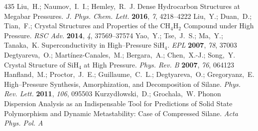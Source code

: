\documentclass[12pt,letterpaper,oneside]{article}
\begin{document}
\begin{mcitethebibliography}{435}
\mciteBstWouldAddEndPuncttrue
\mciteSetBstMidEndSepPunct{\mcitedefaultmidpunct}
{\mcitedefaultendpunct}{\mcitedefaultseppunct}\relax
\EndOfBibitem
{}
Liu,~H.; Naumov,~I.~I.; Hemley,~R.~J. Dense Hydrocarbon Structures at Megabar
  Pressures. \emph{J. Phys. Chem. Lett.} \textbf{2016}, \emph{7},
  4218--4222\relax
\mciteBstWouldAddEndPuncttrue
\mciteSetBstMidEndSepPunct{\mcitedefaultmidpunct}
{\mcitedefaultendpunct}{\mcitedefaultseppunct}\relax
\EndOfBibitem
{}
Liu,~Y.; Duan,~D.; Tian,~F.;   Crystal
  Structures and Properties of the CH$_4$H$_2$ Compound under High Pressure.
  \emph{RSC Adv.} \textbf{2014}, \emph{4}, 37569--37574\relax
\mciteBstWouldAddEndPuncttrue
\mciteSetBstMidEndSepPunct{\mcitedefaultmidpunct}
{\mcitedefaultendpunct}{\mcitedefaultseppunct}\relax
\EndOfBibitem
{}
Yao,~Y.; Tse,~J.~S.; Ma,~Y.; Tanaka,~K. Superconductivity in High--Pressure
  SiH$_4$. \emph{EPL} \textbf{2007}, \emph{78}, 37003\relax
\mciteBstWouldAddEndPuncttrue
\mciteSetBstMidEndSepPunct{\mcitedefaultmidpunct}
{\mcitedefaultendpunct}{\mcitedefaultseppunct}\relax
\EndOfBibitem
{}
Degtyareva,~O.; Mart{\'i}nez-Canales,~M.; Bergara,~A.; Chen,~X.-J.; Song,~Y.
    Crystal Structure of SiH$_4$ at High Pressure. \emph{Phys.
  Rev. B} \textbf{2007}, \emph{76}, 064123\relax
\mciteBstWouldAddEndPuncttrue
\mciteSetBstMidEndSepPunct{\mcitedefaultmidpunct}
{\mcitedefaultendpunct}{\mcitedefaultseppunct}\relax
\EndOfBibitem
{}
Hanfland,~M.; Proctor,~J.~E.; Guillaume,~C.~L.; Degtyareva,~O.; Gregoryanz,~E.
  High--Pressure Synthesis, Amorphization, and Decomposition of Silane.
  \emph{Phys. Rev. Lett.} \textbf{2011}, \emph{106}, 095503\relax
\mciteBstWouldAddEndPuncttrue
\mciteSetBstMidEndSepPunct{\mcitedefaultmidpunct}
{\mcitedefaultendpunct}{\mcitedefaultseppunct}\relax
\EndOfBibitem
{}
Kurzyd{\l}owski,~D.; Grochala,~W. Phonon Dispersion Analysis as an
  Indispensable Tool for Predictions of Solid State Polymorphism and Dynamic
  Metastability: Case of Compressed Silane. \emph{Acta Phys. Pol. A}

\end{mcitethebibliography}
\end{document}
